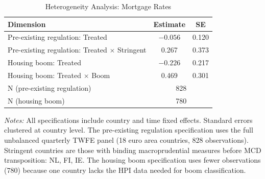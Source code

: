 \begin{table}[!h]
\centering
\caption{Heterogeneity Analysis: Mortgage Rates}
\label{tab:heterogeneity}
\begin{tabular}[t]{lcc}
\toprule
Dimension & Estimate & SE\\
\midrule
Pre-existing regulation: Treated & $-0.056$ & 0.120\\
Pre-existing regulation: Treated $\times$ Stringent & 0.267 & 0.373\\
Housing boom: Treated & $-0.226$ & 0.217\\
Housing boom: Treated $\times$ Boom & 0.469 & 0.301\\
\midrule
N (pre-existing regulation) & \multicolumn{2}{c}{828}\\
N (housing boom) & \multicolumn{2}{c}{780}\\
\bottomrule
\end{tabular}
\par\vspace{0.3em}
{\footnotesize \textit{Notes:} All specifications include country and time fixed effects. Standard errors clustered at country level. The pre-existing regulation specification uses the full unbalanced quarterly TWFE panel (18 euro area countries, 828 observations). Stringent countries are those with binding macroprudential measures before MCD transposition: NL, FI, IE. The housing boom specification uses fewer observations (780) because one country lacks the HPI data needed for boom classification.}
\end{table}
